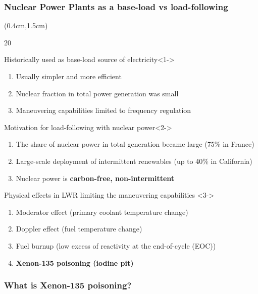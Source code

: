 \begin{frame}
\frametitle{Nuclear Power Plants as a base-load vs load-following}
\begin{textblock*}{12cm}(0.4cm,1.5cm) %
\begin{overlayarea}{\linewidth}{20\baselineskip}
	\begin{block}{Historically used as base-load source of electricity}<1->
		\begin{enumerate}
			\item Usually simpler and more efficient
			\item Nuclear fraction in total power generation was small
			\item Maneuvering capabilities limited to frequency regulation
		\end{enumerate}
	\end{block}
	\begin{block}{Motivation for load-following with nuclear power}<2->
	\begin{enumerate}
		\item The share of nuclear power in total generation became large 
		(75\% in France)
		\item Large-scale deployment of intermittent renewables (up to 40\% in 
		California)
		\item Nuclear power is \textbf{carbon-free, non-intermittent}
	\end{enumerate}
	\end{block}
	\begin{block}{Physical effects in \gls{LWR} limiting the maneuvering 
	capabilities 
		\cite{lokhov_technical_2011}}<3->
	\begin{enumerate}
		\item<3-> Moderator effect (primary coolant temperature change)
		\item<3-> Doppler effect (fuel temperature change)
		\item<4-> Fuel burnup (low excess of reactivity at the end-of-cycle 
		(EOC))
		\item<5-> \textbf{Xenon-135 poisoning (iodine pit)}
	\end{enumerate}
\end{block}
\end{overlayarea}
\end{textblock*}
\end{frame}

\begin{frame}
\frametitle{What is Xenon-135 poisoning? \cite{noauthor_nuclear_nodate-1}}
\end{frame}

